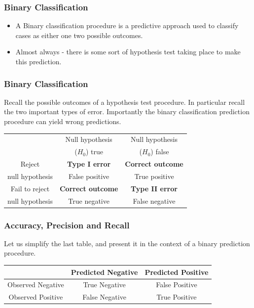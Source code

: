 \documentclass[a4]{beamer}
\begin{document}
\begin{frame}
\frametitle{Binary Classification}
\begin{itemize}
\item A Binary classification procedure is a predictive approach used to classify cases as either one two possible outcomes.
\item Almost always - there is some sort of hypothesis test taking place to make this prediction.

\end{itemize}


\end{frame}
\begin{frame}
\frametitle{Binary Classification}
Recall the possible outcomes of a hypothesis test procedure. In particular recall the two important types of error. Importantly the binary classification prediction procedure can yield wrong predictions.
\begin{center}
\begin{tabular}{|c|c|c|} \hline
               & Null hypothesis & Null hypothesis   \\
               & ($H_0$) true	 & ($H_0$) false \\ \hline
Reject 	       & \textbf{Type I error }   & \textbf{Correct outcome} \\
null hypothesis& False positive  & True positive \\ \hline
Fail to reject & \textbf{Correct outcome} & \textbf{Type II error} \\
null hypothesis & True negative  & False negative \\ \hline
\end{tabular} 
\end{center}
\end{frame}
\begin{frame}
\frametitle{Accuracy, Precision and Recall}
Let us simplify the last table, and present it in the context of a binary prediction procedure.
\begin{center}
\begin{tabular}{|c|c|c|}
\hline  & Predicted Negative & Predicted Positive \\ 
\hline Observed Negative & True Negative & False Positive \\ 
\hline Observed Positive & False Negative & True Positive \\ 
\hline 
\end{tabular} 
\end{center}
\end{frame}
\end{document}
